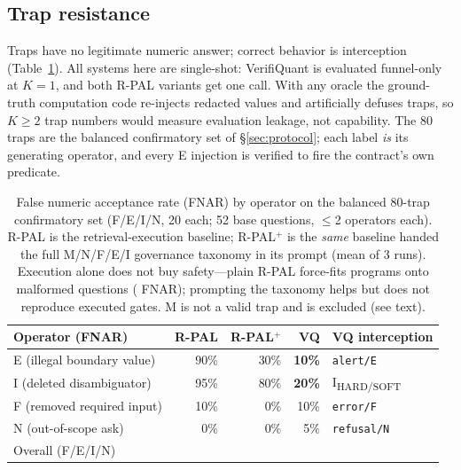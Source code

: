 \subsection{Trap resistance}\label{sec:trap}
Traps have no legitimate numeric answer; correct behavior is interception (Table~\ref{tab:trap}).
All systems here are single-shot: VerifiQuant is evaluated funnel-only at $K{=}1$, and both R-PAL variants get one call.
With any oracle the ground-truth computation code re-injects redacted values and artificially defuses traps, so $K\geq2$ trap numbers would measure evaluation leakage, not capability.
The 80 traps are the balanced confirmatory set of \S\ref{sec:protocol}; each label \emph{is} its generating operator, and every E injection is verified to fire the contract's own predicate.

\begin{table}[t]
\caption{False numeric acceptance rate (FNAR) by operator on the balanced 80-trap confirmatory set (F/E/I/N, 20 each; 52 base questions, $\leq$2 operators each).
R-PAL is the retrieval-execution baseline; R-PAL$^{+}$ is the \emph{same} baseline handed the full M/N/F/E/I governance taxonomy in its prompt (mean of 3 runs).
Execution alone does not buy safety---plain R-PAL force-fits programs onto malformed questions (\govPlainFnar{} FNAR); prompting the taxonomy helps but does not reproduce executed gates.
M is not a valid trap and is excluded (see text).}
\label{tab:trap}
\small
\begin{tabular}{@{}lrrrl@{}}
\toprule
Operator (FNAR) & R-PAL & R-PAL$^{+}$ & VQ & VQ interception \\
\midrule
E (illegal boundary value) & 90\% & 30\% & \textbf{10\%} & \texttt{alert/E} \\
I (deleted disambiguator) & 95\% & 80\% & \textbf{20\%} & I\textsubscript{HARD/SOFT} \\
F (removed required input) & 10\% & 0\% & 10\% & \texttt{error/F} \\
N (out-of-scope ask) & 0\% & 0\% & 5\% & \texttt{refusal/N} \\
\midrule
Overall (F/E/I/N) & \govPlainFnar{} & \govPromptFnar{} & \textbf{\govVQfnar{}} & \\
\bottomrule
\end{tabular}
\end{table}

